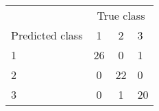 \begin{tabular}{lccl}
  \hline
  & \multicolumn{3}{c}{True class}\\
 Predicted class & 1 & 2 & 3 \\
   \hline
1 &  26 &   0 &   1 \\ 
  2 &   0 &  22 &   0 \\ 
  3 &   0 &   1 &  20 \\ 
   \hline
\end{tabular}
